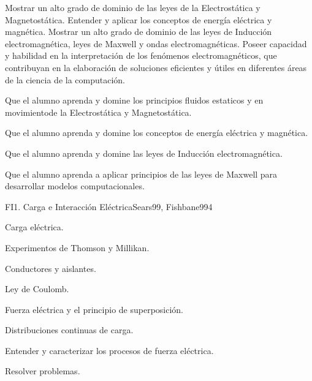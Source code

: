 \begin{syllabus}


\begin{justification}
Mostrar un alto grado de dominio de las leyes de la Electrostática y Magnetostática. Entender y aplicar los conceptos de energía eléctrica y magnética. Mostrar un alto grado de dominio de las leyes de Inducción electromagnética, leyes de Maxwell y ondas electromagnéticas. Poseer capacidad y habilidad en la interpretación de los fenómenos electromagnéticos, que contribuyan en la elaboración de soluciones eficientes y útiles en diferentes áreas de la ciencia de la computación. 
\end{justification}

\begin{goals}
\item  Que el alumno aprenda y domine los principios fluidos estaticos y en movimientode la Electrostática y Magnetostática.
\item  Que el alumno aprenda y domine los conceptos de energía eléctrica y magnética.
\item  Que el alumno aprenda y domine las leyes de Inducción electromagnética.
\item  Que el alumno aprenda a aplicar principios de las leyes de Maxwell para desarrollar modelos computacionales.
\end{goals}

\begin{outcomes}
\end{outcomes}

\begin{unit}{FI1. Carga e Interacción Eléctrica}{Sears99, Fishbane99}{4}
   \begin{topics}
         \item  Carga eléctrica.
	 \item  Experimentos de Thomson y Millikan.
         \item  Conductores y aislantes.
	 \item  Ley de Coulomb.
         \item  Fuerza eléctrica y el principio de superposición.
         \item  Distribuciones continuas de carga.
   \end{topics}

   \begin{learningoutcomes}
         \item  Entender y caracterizar los procesos de fuerza eléctrica.
         \item  Resolver problemas.
   \end{learningoutcomes}
\end{unit}


\end{syllabus}
